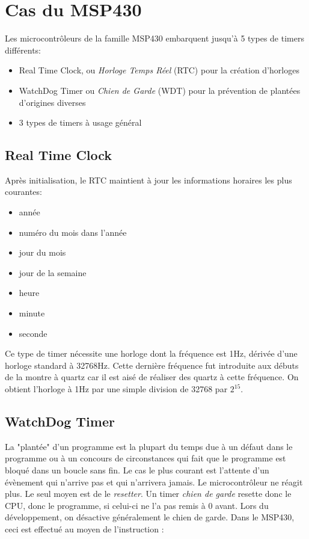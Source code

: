 \section{Cas du MSP430}
Les microcontrôleurs de la famille MSP430 embarquent jusqu'à 5 types de timers différents:
\begin{itemize}[label=\textbullet,font=\small]
\item Real Time Clock, ou \textit{Horloge Temps Réel} (RTC) pour la création d'horloges
\item WatchDog Timer ou \textit{Chien de Garde} (WDT) pour la prévention de plantées d'origines diverses
\item 3 types de timers à usage général
\end{itemize}

\subsection{Real Time Clock}
Après initialisation, le RTC maintient à jour les informations horaires les plus courantes:
\begin{itemize}[label=\textbullet,font=\small]
\item année
\item numéro du mois dans l'année
\item jour du mois
\item jour de la semaine
\item heure
\item minute
\item seconde
\end{itemize}

Ce type de timer nécessite une horloge dont la fréquence est 1Hz, dérivée d'une horloge standard à 32768Hz. Cette dernière fréquence fut introduite aux débuts de la montre à quartz car il est aisé de réaliser des quartz à cette fréquence. On obtient l'horloge à 1Hz par une simple division de 32768 par $2^{15}$.

\subsection{WatchDog Timer}
La "plantée" d'un programme est la plupart du temps due à un défaut dans le programme ou à un concours de circonstances qui fait que le programme est bloqué dans un boucle sans fin. Le cas le plus courant est l'attente d'un évènement qui n'arrive pas et qui n'arrivera jamais.
Le microcontrôleur ne réagit plus. Le seul moyen est de le \textit{resetter}.
Un timer \textit{chien de garde} resette donc le CPU, donc le programme, si celui-ci ne l'a pas remis à 0 avant.
Lors du développement, on désactive généralement le chien de garde. Dans le MSP430, ceci est effectué au moyen de l'instruction :

